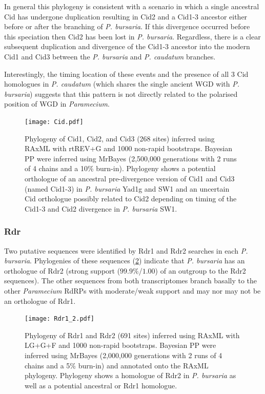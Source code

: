 In general this phylogeny is consistent with a scenario in which a
single ancestral Cid has undergone duplication resulting
in Cid2 and a Cid1-3 ancestor either before
or after the branching of \textit{P. bursaria}.
If this divergence occurred before this speciation
then Cid2 has been lost in \textit{P. bursaria}.
Regardless, there is a clear subsequent 
duplication and divergence of the Cid1-3 ancestor into the modern 
Cid1 and Cid3 
between the \textit{P. bursaria} and \textit{P. caudatum} branches.

Interestingly, the timing location of these events and the presence of 
all 3 Cid homologues in
\textit{P. caudatum} (which shares the single ancient WGD with \textit{P. bursaria})
suggests that this pattern is not
directly related to the polarised position of WGD in \textit{Paramecium}.  

\begin{figure}
    \texttt{[image: Cid.pdf]}
    \caption[Cid Phylogeny]{
        Phylogeny of Cid1, Cid2, and Cid3 (268 sites) inferred
        using RAxML with rtREV+G and 1000 non-rapid bootstraps.
        Bayesian PP were inferred using MrBayes (2,500,000 generations 
        with 2 runs of 4 chains and a 10\% burn-in).  Phylogeny
        shows a potential orthologue of an ancestral pre-divergence
        version of Cid1 and Cid3 (named Cid1-3) in \textit{P. bursaria}
        Yad1g and SW1 and an uncertain Cid orthologue possibly
        related to Cid2 depending on timing of the Cid1-3 and Cid2 divergence
        in \textit{P. bursaria} SW1.}
    \label{fig:cidphlyo}
\end{figure}

\subsubsection{Rdr}

Two putative sequences were identified by Rdr1 and Rdr2 searches in each
\textit{P. bursaria}.  Phylogenies of these sequences (\cref{fig:rdr12_phylo})
indicate that \textit{P. bursaria} has an orthologue of
Rdr2 (strong support (\(99.9\%\)/\(1.00\)) of an outgroup to the Rdr2 sequences).
The other sequences from both transcriptomes branch basally
to the other \textit{Paramecium} RdRPs with moderate/weak support
and may nor may not be an orthologue of Rdr1.

\begin{figure}
    \texttt{[image: Rdr1\_2.pdf]}
    \caption[Rdr1 and Rdr2 Phylogeny]{Phylogeny of Rdr1 and Rdr2
        (691 sites) inferred using RAxML with LG+G+F and 1000
        non-rapid bootstraps.  Bayesian PP were inferred using MrBayes
        (2,000,000 generations with 2 runs of 4 chains and a 5\% burn-in)
        and annotated onto the RAxML phylogeny. Phylogeny
        shows a homologue of Rdr2 in \textit{P. bursaria} as well
    as a potential ancestral or Rdr1 homologue.}
    \label{fig:rdr12_phylo}
\end{figure}

